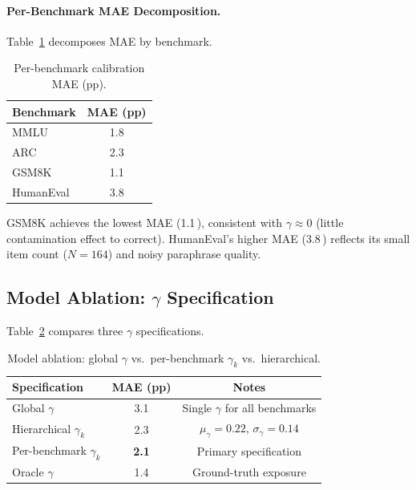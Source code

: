 \documentclass[11pt,a4paper]{article}
\newcommand{\pp}{\,\text{pp}}
\begin{document}
\paragraph{Per-Benchmark MAE Decomposition.}
Table~\ref{tab:mae_benchmark} decomposes MAE by benchmark.

\begin{table}[t]
\centering
\small
\caption{Per-benchmark calibration MAE (pp).}
\label{tab:mae_benchmark}
\begin{tabular}{lc}
\toprule
Benchmark & MAE (pp) \\
\midrule
MMLU      & 1.8 \\
ARC       & 2.3 \\
GSM8K     & 1.1 \\
HumanEval & 3.8 \\
\bottomrule
\end{tabular}
\end{table}

GSM8K achieves the lowest MAE (1.1\pp{}), consistent with $\gamma\approx 0$ (little contamination effect to correct).
HumanEval's higher MAE (3.8\pp{}) reflects its small item count ($N=164$) and noisy paraphrase quality.


\subsection{Model Ablation: $\gamma$ Specification}
\label{sec:gamma_ablation}

Table~\ref{tab:gamma_ablation} compares three $\gamma$ specifications.

\begin{table}[t]
\centering
\small
\caption{Model ablation: global $\gamma$ vs.\ per-benchmark $\gamma_k$ vs.\ hierarchical.}
\label{tab:gamma_ablation}
\begin{tabular}{lcc}
\toprule
Specification & MAE (pp) & Notes \\
\midrule
Global $\gamma$       & 3.1 & Single $\gamma$ for all benchmarks \\
Hierarchical $\gamma_k$ & 2.3 & $\mu_\gamma=0.22$, $\sigma_\gamma=0.14$ \\
Per-benchmark $\gamma_k$ & \textbf{2.1} & Primary specification \\
Oracle $\gamma$ & 1.4 & Ground-truth exposure \\
\bottomrule
\end{tabular}
\end{table}
\end{document}
